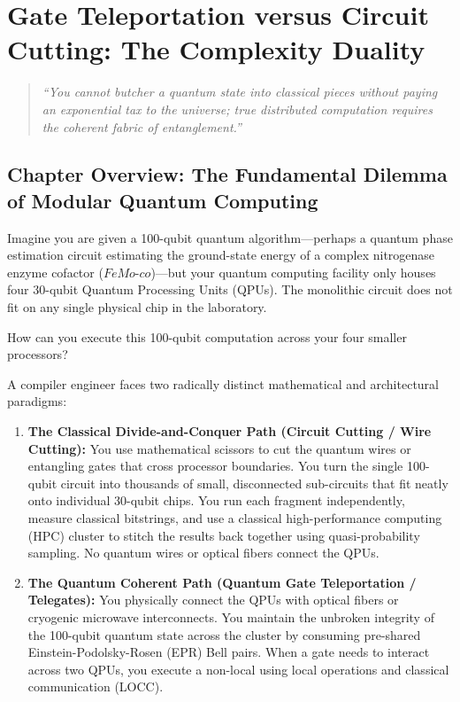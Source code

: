 \chapter{Gate Teleportation versus Circuit Cutting: The Complexity Duality}
\label{ch:teleportation_vs_cutting}

\begin{quote}
\textit{``You cannot butcher a quantum state into classical pieces without paying an exponential tax to the universe; true distributed computation requires the coherent fabric of entanglement.''}
\end{quote}

\section*{Chapter Overview: The Fundamental Dilemma of Modular Quantum Computing}

Imagine you are given a 100-qubit quantum algorithm---perhaps a quantum phase estimation circuit estimating the ground-state energy of a complex nitrogenase enzyme cofactor ($FeMo\text{-}co$)---but your quantum computing facility only houses four 30-qubit Quantum Processing Units (QPUs). The monolithic circuit does not fit on any single physical chip in the laboratory.

How can you execute this 100-qubit computation across your four smaller processors?

A compiler engineer faces two radically distinct mathematical and architectural paradigms:

\begin{enumerate}
    \item \textbf{The Classical Divide-and-Conquer Path (Circuit Cutting / Wire Cutting):} You use mathematical scissors to cut the quantum wires or entangling gates that cross processor boundaries. You turn the single 100-qubit circuit into thousands of small, disconnected sub-circuits that fit neatly onto individual 30-qubit chips. You run each fragment independently, measure classical bitstrings, and use a classical high-performance computing (HPC) cluster to stitch the results back together using quasi-probability sampling. No quantum wires or optical fibers connect the QPUs.
    
    \item \textbf{The Quantum Coherent Path (Quantum Gate Teleportation / Telegates):} You physically connect the QPUs with optical fibers or cryogenic microwave interconnects. You maintain the unbroken integrity of the 100-qubit quantum state across the cluster by consuming pre-shared Einstein-Podolsky-Rosen (EPR) Bell pairs. When a gate needs to interact across two QPUs, you execute a non-local  using local operations and classical communication (LOCC).
\end{enumerate}

